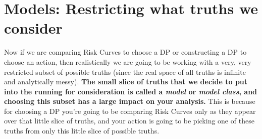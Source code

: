 \section{Models: Restricting what truths we consider}
Now if we are comparing Risk Curves to choose a DP or constructing a DP to choose an action, then realistically we are going to be working with a very, very restricted subset of possible truths (since the real space of all truths is infinite and analytically messy). \textbf{The small slice of truths that we decide to put into the running for consideration is called a \emph{model} or \emph{model class}, and choosing this subset has a large impact on your analysis. }This is because for choosing a DP you're going to be comparing Risk Curves only as they appear over that little slice of truths, and your action is going to be picking one of these truths from only this little slice of possible truths.
\n

